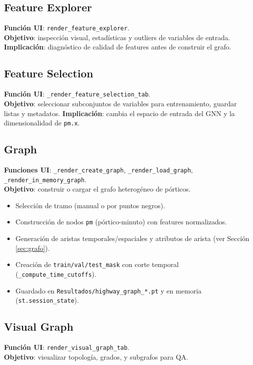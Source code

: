\subsection{Feature Explorer}
\textbf{Funci\'on UI}: \texttt{render\_feature\_explorer}.\\
\textbf{Objetivo}: inspecci\'on visual, estad\'isticas y outliers de variables de entrada.
\textbf{Implicaci\'on}: diagn\'ostico de calidad de features antes de construir el grafo.

\subsection{Feature Selection}
\textbf{Funci\'on UI}: \texttt{\_render\_feature\_selection\_tab}.\\
\textbf{Objetivo}: seleccionar subconjuntos de variables para entrenamiento, guardar listas y metadatos.
\textbf{Implicaci\'on}: cambia el espacio de entrada del GNN y la dimensionalidad de \texttt{pm.x}.

\subsection{Graph}
\textbf{Funciones UI}: \texttt{\_render\_create\_graph}, \texttt{\_render\_load\_graph}, \texttt{\_render\_in\_memory\_graph}.\\
\textbf{Objetivo}: construir o cargar el grafo heterog\'eneo de p\'orticos.
\begin{itemize}[leftmargin=*]
  \item Selecci\'on de tramo (manual o por puntos negros).
  \item Construcci\'on de nodos \texttt{pm} (p\'ortico-minuto) con features normalizados.
  \item Generaci\'on de aristas temporales/espaciales y atributos de arista (ver Secci\'on \ref{sec:grafo}).
  \item Creaci\'on de \texttt{train/val/test\_mask} con corte temporal (\texttt{\_compute\_time\_cutoffs}).
  \item Guardado en \texttt{Resultados/highway\_graph\_*.pt} y en memoria (\texttt{st.session\_state}).
\end{itemize}

\subsection{Visual Graph}
\textbf{Funci\'on UI}: \texttt{render\_visual\_graph\_tab}.\\
\textbf{Objetivo}: visualizar topolog\'ia, grados, y subgrafos para QA.

